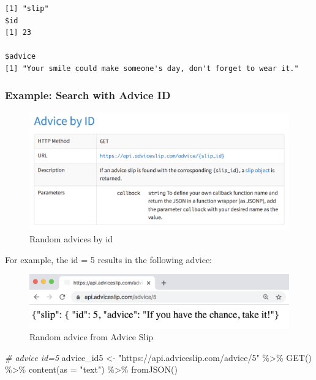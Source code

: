 \documentclass[
]{book}
\newenvironment{Shaded}{\begin{snugshade}}{\end{snugshade}}
\newcommand{\AttributeTok}[1]{\textcolor[rgb]{0.77,0.63,0.00}{#1}}
\newcommand{\CommentTok}[1]{\textcolor[rgb]{0.56,0.35,0.01}{\textit{#1}}}
\newcommand{\FunctionTok}[1]{\textcolor[rgb]{0.00,0.00,0.00}{#1}}
\newcommand{\NormalTok}[1]{#1}
\newcommand{\OtherTok}[1]{\textcolor[rgb]{0.56,0.35,0.01}{#1}}
\newcommand{\SpecialCharTok}[1]{\textcolor[rgb]{0.00,0.00,0.00}{#1}}
\newcommand{\StringTok}[1]{\textcolor[rgb]{0.31,0.60,0.02}{#1}}
\begin{document}
\begin{verbatim}
[1] "slip"
$id
[1] 23

$advice
[1] "Your smile could make someone's day, don't forget to wear it."
\end{verbatim}

\hypertarget{example-search-with-advice-id}{%
\subsubsection*{Example: Search with Advice ID}\label{example-search-with-advice-id}}

\begin{figure}

{\centering \includegraphics[width=0.7\linewidth]{images/api/advice-slip-by-id} 

}

\caption{Random advices by id}\label{fig:unnamed-chunk-122}
\end{figure}

For example, the id = 5 results in the following advice:

\begin{figure}

{\centering \includegraphics[width=0.7\linewidth]{images/api/advice-slip-id5} 

}

\caption{Random advice from Advice Slip}\label{fig:unnamed-chunk-123}
\end{figure}

\begin{Shaded}
\begin{Highlighting}[]
\CommentTok{\# advice id=5}
\NormalTok{advice\_id5 }\OtherTok{\textless{}{-}} \StringTok{"https://api.adviceslip.com/advice/5"} \SpecialCharTok{\%\textgreater{}\%}
  \FunctionTok{GET}\NormalTok{() }\SpecialCharTok{\%\textgreater{}\%}
  \FunctionTok{content}\NormalTok{(}\AttributeTok{as =} \StringTok{"text"}\NormalTok{) }\SpecialCharTok{\%\textgreater{}\%}
  \FunctionTok{fromJSON}\NormalTok{()}
\end{Highlighting}
\end{Shaded}
\end{document}
